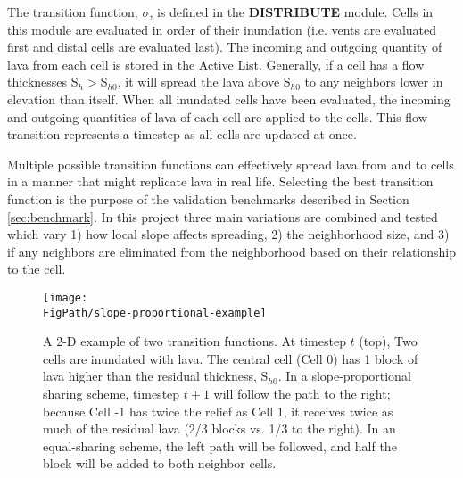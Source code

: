 		The transition function, $\sigma$, is defined in the \textbf{DISTRIBUTE} module. Cells in this module are evaluated in order of their inundation (i.e. vents are evaluated first and distal cells are evaluated last). The incoming and outgoing quantity of lava from each cell is stored in the Active List. Generally, if a cell has a flow thicknesses S$_h>$S$_{h0}$, it will spread the lava above S$_{h0}$ to any neighbors lower in elevation than itself. When all inundated cells have been evaluated, the incoming and outgoing quantities of lava of each cell are applied to the cells. This flow transition represents a timestep as all cells are updated at once.
		
		Multiple possible transition functions can effectively spread lava from and to cells in a manner that might replicate lava in real life. Selecting the best transition function is the purpose of the validation benchmarks described in Section \ref{sec:benchmark}. In this project three main variations are combined and tested which vary 1) how local slope affects spreading, 2) the neighborhood size, and 3) if any neighbors are eliminated from the neighborhood based on their relationship to the cell.
		
		\begin{figure}[!h]
			\centering
			\texttt{[image: \\FigPath/slope-proportional-example]}
			\caption[A 2-D example of two transition functions with different slope treatments]{A 2-D example of two transition functions. At timestep $t$ (top), Two cells are inundated with lava. The central cell (Cell 0) has 1 block of lava higher than the residual thickness, S$_{h0}$. In a slope-proportional sharing scheme, timestep $t+1$ will follow the path to the right; because Cell -1 has twice the relief as Cell 1, it receives twice as much of the residual lava (2/3 blocks vs. 1/3 to the right). In an equal-sharing scheme, the left path will be followed, and half the block will be added to both neighbor cells.}
			\label{fig_BernieSanders}
		\end{figure}
		
